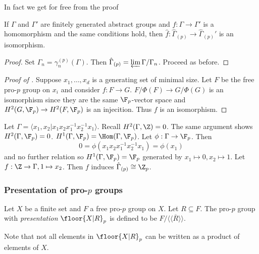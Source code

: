 \documentclass[a4paper]{article}
\begin{document}
In fact we get for free from the proof

\begin{theorem}
  If \(\Gamma\) and \(\Gamma'\) are finitely generated abstract groups and \(f: \Gamma \to \Gamma'\) is a homomorphism and the same conditions hold, then \(\hat f: \hat \Gamma_{(p)} \to \hat \Gamma_{(p)}'\) is an isomorphism.
\end{theorem}

\begin{proof}
  Set \(\Gamma_n = \gamma_n^{(p)}(\Gamma)\). Then \(\hat \Gamma_{(p)} = \varprojlim \Gamma/\Gamma_n\). Proceed as before.
\end{proof}

\begin{proof}[Proof of ]
  Suppose \(x_1, \dots, x_d\) is a generating set of minimal size. Let \(F\) be the free pro-\(p\) group on \(x_i\) and consider \(f: F \to G\). \(F/\Phi(F) \to G/\Phi(G)\) is an isomorphism since they are the same \(\F_p\)-vector space and \(H^2(G, \F_p) \to H^2(F, \F_p)\) is an injecition. Thus \(f\) is an isomorphism.
\end{proof}

\begin{eg}
  Let \(\Gamma = \langle x_1, x_2| x_1x_2x_1^{-1}x_2^{-1}x_1 \rangle\). Recall \(H^2(\Gamma, \Z) = 0\). The same argument shows \(H^2(\Gamma, \F_p) = 0\). \(H^1(\Gamma, \F_p) = \Hom(\Gamma, \F_p)\). Let \(\phi: \Gamma \to \F_p\). Then
  \[
    0 = \phi(x_1x_2x_1^{-1}x_2^{-1}x_1) = \phi(x_1)
  \]
  and no further relation so \(H^1(\Gamma, \F_p) = \F_p\) generated by \(x_1 \mapsto 0, x_2 \mapsto 1\). Let \(f: \Z \to \Gamma, 1 \mapsto x_2\). Then \(f\) induces \(\hat \Gamma_{(p)} \cong \Z_p\).
\end{eg}

\subsubsection{Presentation of pro-\(p\) groups}

\begin{definition}
  Let \(X\) be a finite set and \(F\) a free pro-\(p\) group on \(X\). Let \(R \subseteq F\). The pro-\(p\) group with \emph{presentation} \(\floor{X|R}_p\) is defined to be \(F/\overline{\langle\langle R\rangle\rangle}\).
\end{definition}

Note that not all elements in \(\floor{X|R}_p\) can be written as a product of elements of \(X\).
\end{document}
